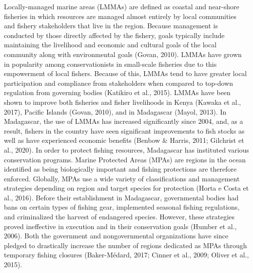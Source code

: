 \documentclass[
]{article}
\begin{document}
Locally-managed marine areas (LMMAs) are defined as coastal and near-shore fisheries in which resources are managed almost entirely by local communities and fishery stakeholders that live in the region. Because management is conducted by those directly affected by the fishery, goals typically include maintaining the livelihood and economic and cultural goals of the local community along with environmental goals (Govan, 2010). LMMAs have grown in popularity among conservationists in small-scale fisheries due to this empowerment of local fishers. Because of this, LMMAs tend to have greater local participation and compliance from stakeholders when compared to top-down regulation from governing bodies (Katikiro et al., 2015). LMMAs have been shown to improve both fisheries and fisher livelihoods in Kenya (Kawaka et al., 2017), Pacific Islands (Govan, 2010), and in Madagascar (Mayol, 2013). In Madagascar, the use of LMMAs has increased significantly since 2004, and, as a result, fishers in the country have seen significant improvements to fish stocks as well as have experienced economic benefits (Benbow \& Harris, 2011; Gilchrist et al., 2020). In order to protect fishing resources, Madagascar has instituted various conservation programs. Marine Protected Areas (MPAs) are regions in the ocean identified as being biologically important and fishing protections are therefore enforced. Globally, MPAs use a wide variety of classifications and management strategies depending on region and target species for protection (Horta e Costa et al., 2016). Before their establishment in Madagascar, governmental bodies had bans on certain types of fishing gear, implemented seasonal fishing regulations, and criminalized the harvest of endangered species. However, these strategies proved ineffective in execution and in their conservation goals (Humber et al., 2006). Both the government and nongovernmental organizations have since pledged to drastically increase the number of regions dedicated as MPAs through temporary fishing closures (Baker-Médard, 2017; Cinner et al., 2009; Oliver et al., 2015).
\end{document}
